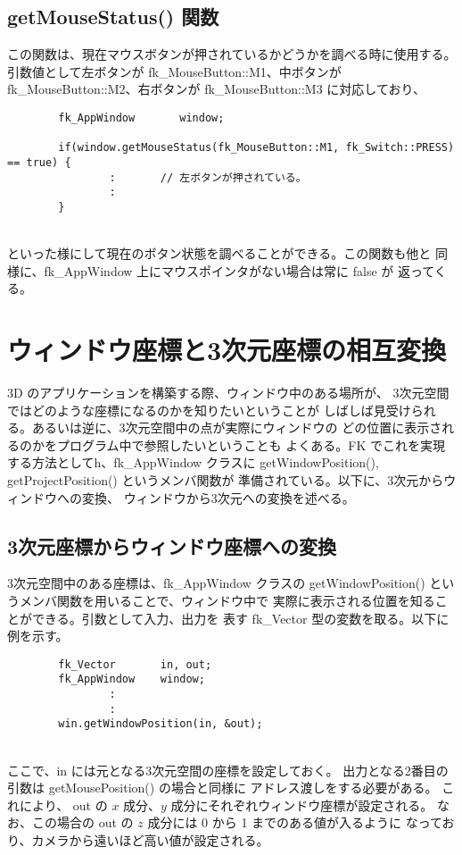 \subsection*{getMouseStatus() 関数}
この関数は、現在マウスボタンが押されているかどうかを調べる時に使用する。
引数値として左ボタンが fk\_MouseButton::M1、中ボタンが fk\_MouseButton::M2、右ボタンが
fk\_MouseButton::M3 に対応しており、
\\
\begin{breakbox}
\begin{verbatim}
        fk_AppWindow       window;

        if(window.getMouseStatus(fk_MouseButton::M1, fk_Switch::PRESS) == true) {
                :       // 左ボタンが押されている。
                :
        }
\end{verbatim}
\end{breakbox}
~ \\
といった様にして現在のボタン状態を調べることができる。この関数も他と
同様に、fk\_AppWindow 上にマウスポインタがない場合は常に false が
返ってくる。

\section{ウィンドウ座標と3次元座標の相互変換} \label{sec:coordinate}
3D のアプリケーションを構築する際、ウィンドウ中のある場所が、
3次元空間ではどのような座標になるのかを知りたいということが
しばしば見受けられる。あるいは逆に、3次元空間中の点が実際にウィンドウの
どの位置に表示されるのかをプログラム中で参照したいということも
よくある。FK でこれを実現する方法としてh、fk\_AppWindow クラスに
getWindowPosition(), getProjectPosition() というメンバ関数が
準備されている。以下に、3次元からウィンドウへの変換、
ウィンドウから3次元への変換を述べる。

\subsection{3次元座標からウィンドウ座標への変換}
3次元空間中のある座標は、fk\_AppWindow クラスの
getWindowPosition() というメンバ関数を用いることで、ウィンドウ中で
実際に表示される位置を知ることができる。引数として入力、出力を
表す fk\_Vector 型の変数を取る。以下に例を示す。
\\
\begin{breakbox}
\begin{verbatim}
        fk_Vector       in, out;
        fk_AppWindow    window;
                :
                :
        win.getWindowPosition(in, &out);
\end{verbatim}
\end{breakbox}
~ \\
ここで、in には元となる3次元空間の座標を設定しておく。
出力となる2番目の引数は getMousePosition() の場合と同様に
アドレス渡しをする必要がある。
これにより、
out の \(x\) 成分、\(y\) 成分にそれぞれウィンドウ座標が設定される。
なお、この場合の out の \(z\) 成分には 0 から 1 までのある値が入るように
なっており、カメラから遠いほど高い値が設定される。

